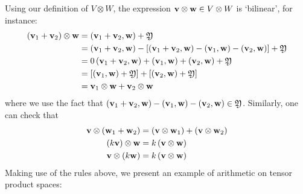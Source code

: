 \documentclass[11pt]{article}
\begin{document}
Using our definition of $V \otimes W$, the expression ${\bf v} \otimes {\bf w} \in V \otimes W$ is `bilinear', for instance:
\begin{equation} \label{eq:tensorrule1}
\begin{aligned}
\left( {{\bf v}_1 + {\bf v}_2}\right)  \otimes  \mathbf{w} &= \left( {{\bf v}_1 + {\bf v}_2,\mathbf{w}}\right)  + \mathfrak{Y} \\
&= \left( {{\bf v}_1 + {\bf v}_2,\mathbf{w}}\right)  - \left\lbrack  {\left( {{\bf v}_1 + {\bf v}_2,\mathbf{w}}\right)  - \left( {{\bf v}_1,\mathbf{w}}\right)  - \left( {{\bf v}_2,\mathbf{w}}\right) }\right\rbrack   + \mathfrak{Y}
\\
&= 0\left( {{\bf v}_1 + {\bf v}_2,\mathbf{w}}\right)  + \left( {{\bf v}_1,\mathbf{w}}\right)  + \left( {{\bf v}_2,\mathbf{w}}\right)  + \mathfrak{Y}
\\
&= \left\lbrack  {\left( {{\bf v}_1,\mathbf{w}}\right)  + \mathfrak{Y}}\right\rbrack   + \left\lbrack  {\left( {{\bf v}_2,\mathbf{w}}\right)  + \mathfrak{Y}}\right\rbrack
\\
&= {\bf v}_1 \otimes  {\bf w} + {\bf v}_2 \otimes  {\bf w}
\end{aligned}
\end{equation}
where we use the fact that $\left( {{\bf v}_1 + {\bf v}_2,\mathbf{w}}\right)  - \left( {{\bf v}_1,\mathbf{w}}\right)  - \left( {{\bf v}_2,\mathbf{w}}\right) \in \mathfrak{Y}$. Similarly, one can check that
\begin{equation} \label{eq:tensorrule2}
\begin{aligned}
\mathbf{v} \otimes  \left( {{\bf w}_1 + {\bf w}_2}\right)  &= \left( {\mathbf{v} \otimes  {\bf w}_1}\right)  + \left( {\mathbf{v} \otimes  {\bf w}_2}\right)
\\
\left( {k\mathbf{v}}\right)  \otimes  \mathbf{w} &= k\left( {\mathbf{v} \otimes  \mathbf{w}}\right)
\\
\mathbf{v} \otimes  \left( {k\mathbf{w}}\right)  &= k\left( {\mathbf{v} \otimes  \mathbf{w}}\right)
\end{aligned}
\end{equation}
Making use of the rules above, we present an example of arithmetic on tensor product spaces:
\end{document}

